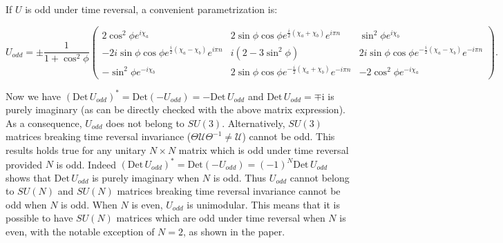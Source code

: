 \documentclass[aps,pra,showpacs,twocolumn,superscriptaddress]{revtex4-1}
\newcommand{\imag}{\mathrm{i}}
\begin{document}
If $U$ is odd under time reversal, a convenient parametrization is: 
\begin{widetext}
\begin{equation}
	U_{odd}=\pm \frac{1}{1+\cos^2\phi}\left(\begin{matrix}
		2\cos^2\phi e^{i\chi_a} & 2\sin\phi\cos\phi e^{\frac{i}{2}(\chi_a+\chi_b)}e^{i\pi n} & \sin^2\phi e^{i\chi_b}\\
		-2i\sin\phi\cos\phi e^{\frac{i}{2}(\chi_a-\chi_b)}e^{i\pi n} & i(2-3\sin^2\phi) & 2i\sin\phi\cos\phi e^{-\frac{i}{2}(\chi_a-\chi_b)}e^{-i\pi n}\\
		-\sin^2\phi e^{-i\chi_b} & 2\sin\phi\cos\phi e^{-\frac{i}{2}(\chi_a+\chi_b)}e^{-i\pi n} & -2\cos^2\phi e^{-i\chi_a}
	\end{matrix}\right).
\end{equation}	
\end{widetext}
Now we have 
$(\textrm{Det} \, U_{odd})^* = \textrm{Det}(-U_{odd}) = -\textrm{Det} \, U_{odd}$ and $\textrm{Det} \, U_{odd} = \mp \imag$
is purely imaginary (as can be directly checked with the above matrix expression). 
As a consequence, $U_{odd}$ does not belong to $SU(3)$. 
Alternatively, $SU(3)$ matrices breaking time reversal invariance 
($\Theta \mathcal{U} \Theta^{-1} \neq \mathcal{U}$) cannot be odd. 
This results holds true for any unitary $N\times N$ matrix which is odd under 
time reversal provided $N$ is odd. 
Indeed $(\textrm{Det} \, U_{odd})^* = \textrm{Det}(-U_{odd}) = (-1)^N \textrm{Det} \, U_{odd}$ 
shows that $\textrm{Det} \,U_{odd}$ is purely imaginary when $N$ is odd. 
Thus $U_{odd}$ cannot belong to $SU(N)$ and $SU(N)$ matrices breaking time 
reversal invariance cannot be odd when $N$ is odd. When $N$ is even, $U_{odd}$ is unimodular. 
This means that it is possible to have $SU(N)$ matrices which are odd under time reversal when $N$ is even, 
with the notable exception of $N=2$, as shown in the paper. 
	
\end{document}

